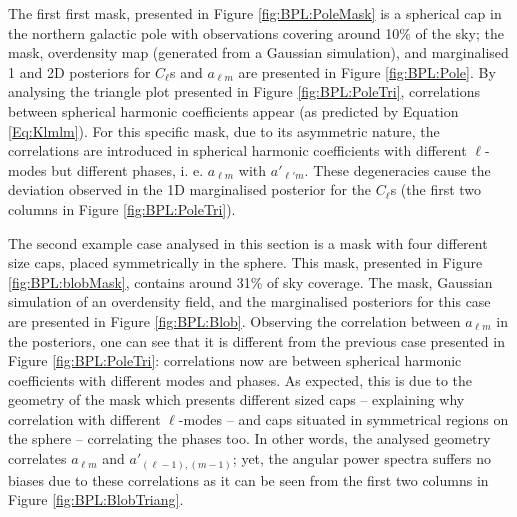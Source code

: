 \qquad The first first mask, presented in Figure \ref{fig:BPL:PoleMask} is a spherical cap in the northern galactic pole with observations covering around 10\% of the sky; the mask, overdensity map (generated from a Gaussian simulation), and marginalised 1 and 2D posteriors for $C_{\ell}$s and $a_{\ell m}$ are presented in Figure \ref{fig:BPL:Pole}. By analysing the triangle plot presented in Figure \ref{fig:BPL:PoleTri}, correlations between spherical harmonic coefficients appear (as predicted by Equation \ref{Eq:Klmlm}). For this specific mask, due to its asymmetric nature, the correlations are introduced in spherical harmonic coefficients with different $\ell$-modes but different phases, i. e. $a_{\ell m}$ with $a'_{\ell' m}$. These degeneracies cause the deviation observed in the 1D marginalised posterior for the $C_{\ell}$s (the first two columns in Figure \ref{fig:BPL:PoleTri}).

\qquad The second example case analysed in this section is a mask with four different size caps, placed symmetrically in the sphere. This mask, presented in Figure \ref{fig:BPL:blobMask}, contains around 31\% of sky coverage. The mask, Gaussian simulation of an overdensity field, and the marginalised posteriors for this case are presented in Figure \ref{fig:BPL:Blob}. Observing the correlation between $a_{\ell m}$ in the posteriors, one can see that it is different from the previous case presented in Figure \ref{fig:BPL:PoleTri}: correlations now are between spherical harmonic coefficients with different modes and phases. As expected, this is due to the geometry of the mask which presents different sized caps -- explaining why correlation with different $\ell$-modes -- and caps situated in symmetrical regions on the sphere -- correlating the phases too. In other words, the analysed geometry correlates $a_{\ell m}$ and $a'_{(\ell-1),(m-1)}$; yet, the angular power spectra suffers no biases due to these correlations as it can be seen from the first two columns in Figure \ref{fig:BPL:BlobTriang}.

